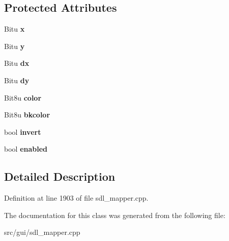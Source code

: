 \subsection*{Protected Attributes}
\begin{DoxyCompactItemize}
\item 
\hypertarget{classCButton_a31c9a5bc0e54382407372236ef0fce68}{Bitu {\bfseries x}}\label{classCButton_a31c9a5bc0e54382407372236ef0fce68}

\item 
\hypertarget{classCButton_a6be6467fc0eb283d33caa042c6c2bfbe}{Bitu {\bfseries y}}\label{classCButton_a6be6467fc0eb283d33caa042c6c2bfbe}

\item 
\hypertarget{classCButton_a0d46295304a83ce1a81fc42056ae3959}{Bitu {\bfseries dx}}\label{classCButton_a0d46295304a83ce1a81fc42056ae3959}

\item 
\hypertarget{classCButton_a6bb4df5cec766a3675bf3365927ff45f}{Bitu {\bfseries dy}}\label{classCButton_a6bb4df5cec766a3675bf3365927ff45f}

\item 
\hypertarget{classCButton_acf415cea0b3968f10393d204a0c4f4ec}{Bit8u {\bfseries color}}\label{classCButton_acf415cea0b3968f10393d204a0c4f4ec}

\item 
\hypertarget{classCButton_a34acf521fa23393acf3aa72b627489e6}{Bit8u {\bfseries bkcolor}}\label{classCButton_a34acf521fa23393acf3aa72b627489e6}

\item 
\hypertarget{classCButton_a8b3db5e11eaef4d5b539493abfcf0db9}{bool {\bfseries invert}}\label{classCButton_a8b3db5e11eaef4d5b539493abfcf0db9}

\item 
\hypertarget{classCButton_a4037c6c6e9cce44e38d21c4f87925193}{bool {\bfseries enabled}}\label{classCButton_a4037c6c6e9cce44e38d21c4f87925193}

\end{DoxyCompactItemize}


\subsection{Detailed Description}


Definition at line 1903 of file sdl\-\_\-mapper.\-cpp.



The documentation for this class was generated from the following file\-:\begin{DoxyCompactItemize}
\item 
src/gui/sdl\-\_\-mapper.\-cpp\end{DoxyCompactItemize}
